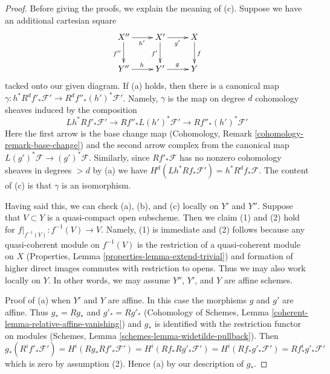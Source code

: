 \documentclass[10pt,a4paper]{amsart}
\theoremstyle{plain}
\theoremstyle{definition}
\theoremstyle{remark}
\numberwithin{equation}{subsection}
\begin{document}
\begin{proof}
Before giving the proofs, we explain the meaning of (c). Suppose
we have an additional cartesian square
$$
\xymatrix{
X'' \ar[d]_{f''} \ar[r]_{h'} &
X' \ar[d]_{f'} \ar[r]_{g'} &
X \ar[d]^f \\
Y'' \ar[r]^h &
Y' \ar[r]^g &
Y
}
$$
tacked onto our given diagram. If (a) holds, then there is a canonical
map $\gamma : h^*R^df'_*\mathcal{F}' \to R^df''_*(h')^*\mathcal{F}'$.
Namely, $\gamma$ is the map on degree $d$ cohomology sheaves
induced by the composition
$$
Lh^*Rf'_*\mathcal{F}' \longrightarrow
Rf''_*L(h')^*\mathcal{F}' \longrightarrow Rf''_*(h')^*\mathcal{F}'
$$
Here the first arrow is the base change map
(Cohomology, Remark \ref{cohomology-remark-base-change}) and
the second arrow complex from the canonical map
$L(g')^*\mathcal{F} \to (g')^*\mathcal{F}$.
Similarly, since $Rf'_*\mathcal{F}$ has no nonzero cohomology sheaves in
degrees $> d$ by (a) we have
$H^d(Lh^*Rf_*\mathcal{F}') = h^*R^df_*\mathcal{F}$.
The content of (c) is that $\gamma$ is an isomorphism.

\medskip\noindent
Having said this, we can check (a), (b), and (c) locally on $Y'$ and $Y''$.
Suppose that $V \subset Y$ is a quasi-compact open subscheme. Then we
claim (1) and (2) hold for $f|_{f^{-1}(V)} : f^{-1}(V) \to V$.
Namely, (1) is immediate and (2) follows because any quasi-coherent
module on $f^{-1}(V)$ is the restriction of a quasi-coherent module
on $X$ (Properties, Lemma \ref{properties-lemma-extend-trivial}) and formation
of higher direct images commutes with restriction to opens.
Thus we may also work locally on $Y$. In other words, we may
assume $Y''$, $Y'$, and $Y$ are affine schemes.

\medskip\noindent
Proof of (a) when $Y'$ and $Y$ are affine. In this case the morphisms
$g$ and $g'$ are affine. Thus $g_* = Rg_*$ and $g'_* = Rg'_*$
(Cohomology of Schemes, Lemma \ref{coherent-lemma-relative-affine-vanishing})
and $g_*$ is identified with the restriction functor on modules
(Schemes, Lemma \ref{schemes-lemma-widetilde-pullback}).
Then
$$
g_*(R^if'_*\mathcal{F}') = H^i(Rg_*Rf'_*\mathcal{F}') =
H^i(Rf_*Rg'_*\mathcal{F}') =
H^i(Rf_*g'_*\mathcal{F}') =
Rf^i_*g'_*\mathcal{F}'
$$
which is zero by assumption (2). Hence (a) by our description of $g_*$.


\end{proof}
\end{document}

